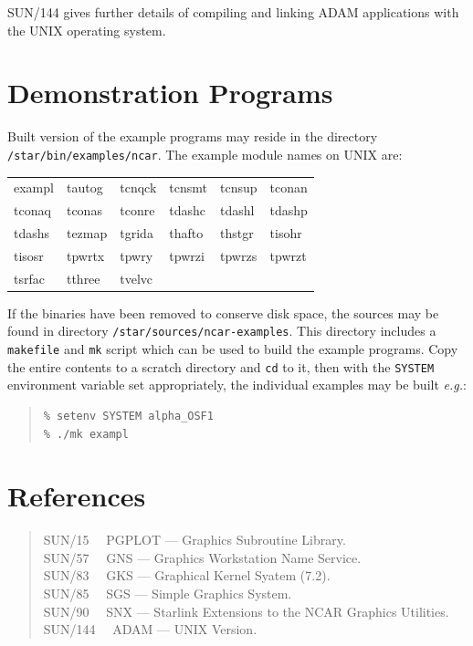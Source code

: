 \documentclass[twoside,11pt]{article}
\newcommand{\xref}[3]{#1}
\newcommand{\xlabel}[1]{}
\renewcommand{\_}{\texttt{\symbol{95}}}
\begin{document}
\xref{SUN/144}{sun144}{} gives further details of compiling and linking
ADAM applications with the UNIX operating system.

\section{\xlabel{demonstration_programs}Demonstration Programs}

Built version of the example programs may reside in the directory 
\texttt{/star/\-bin/\-examples/\-ncar}.  The example module names on UNIX are:

\begin{center}
\ttfamily
\begin{tabular}{llllll}
exampl & tautog & tcnqck & tcnsmt & tcnsup & tconan\\
tconaq & tconas & tconre & tdashc & tdashl & tdashp\\
tdashs & tezmap & tgrida & thafto & thstgr & tisohr\\
tisosr & tpwrtx & tpwry  & tpwrzi & tpwrzs & tpwrzt\\
tsrfac & tthree & tvelvc
\end{tabular}
\normalfont
\end{center}

If the binaries have been removed to conserve disk space, the sources may be
found in directory \texttt{/star/sources/\-ncar-examples}.
This directory includes a \texttt{makefile} and \texttt{mk} script which can be
used to build the example programs.  Copy the entire contents to a scratch
directory and \texttt{cd} to it, then with the \texttt{SYSTEM} environment
variable set appropriately, the individual examples may be built \emph{e.g.}:

\begin{quote}
\begin{verbatim}
% setenv SYSTEM alpha_OSF1
% ./mk exampl
\end{verbatim}
\end{quote}

\section{\xlabel{references}References}

\begin{verse}
\xref{SUN/15 ~~PGPLOT --- Graphics Subroutine Library}{sun15}{}.\\
\xref{SUN/57 ~~GNS --- Graphics Workstation Name Service}{sun57}{}.\\
\xref{SUN/83 ~~GKS --- Graphical Kernel Syatem (7.2)}{sun85}{}.\\
\xref{SUN/85 ~~SGS --- Simple Graphics System}{sun85}{}.\\
\xref{SUN/90 ~~SNX --- Starlink Extensions to the NCAR Graphics 
Utilities}{sun90}{}.\\
\xref{SUN/144 ~~ADAM --- UNIX Version}{sun144}{}.
\end{verse}
\end{document}
